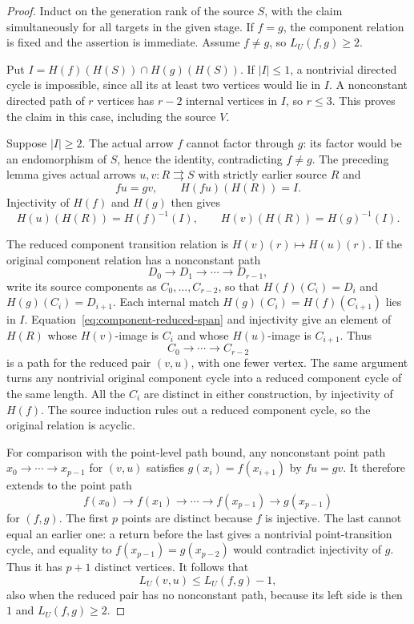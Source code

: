\begin{proof}
Induct on the generation rank of the source $S$, with the claim
simultaneously for all targets in the given stage. If $f=g$,
the component relation is fixed and the assertion is immediate.
Assume $f\ne g$, so $L_U(f,g)\geq2$.

Put $I=H(f)(H(S))\cap H(g)(H(S))$. If $|I|\leq1$, a
nontrivial directed cycle is impossible, since all its at least
two vertices would lie in $I$. A nonconstant directed path of
$r$ vertices has $r-2$ internal vertices in $I$, so $r\leq3$.
This proves the claim in this case, including the source $V$.

Suppose $|I|\geq2$. The actual arrow $f$ cannot factor through
$g$: its factor would be an endomorphism of $S$, hence the
identity, contradicting $f\ne g$. The preceding lemma gives
actual arrows $u,v:R\rightrightarrows S$ with strictly earlier
source $R$ and
\[
                    fu=gv,\qquad H(fu)(H(R))=I.
 \tag{RS}\label{eq:component-reduced-span}
\]
Injectivity of $H(f)$ and $H(g)$ then gives
\[
 H(u)(H(R))=H(f)^{-1}(I),\qquad
 H(v)(H(R))=H(g)^{-1}(I).
\]

The reduced component transition relation is
$H(v)(r)\mapsto H(u)(r)$. If the original component relation
has a nonconstant path
\[
                   D_0\longrightarrow D_1\longrightarrow
                          \cdots\longrightarrow D_{r-1},
\]
write its source components as $C_0,\ldots,C_{r-2}$, so that
$H(f)(C_i)=D_i$ and $H(g)(C_i)=D_{i+1}$. Each internal match
$H(g)(C_i)=H(f)(C_{i+1})$ lies in $I$.
Equation~\eqref{eq:component-reduced-span} and injectivity
give an element of $H(R)$ whose $H(v)$-image is $C_i$ and whose
$H(u)$-image is $C_{i+1}$. Thus
\[
                      C_0\longrightarrow\cdots
                           \longrightarrow C_{r-2}
\]
is a path for the reduced pair $(v,u)$, with one fewer vertex.
The same argument turns any nontrivial original component cycle
into a reduced component cycle of the same length. All the
$C_i$ are distinct in either construction, by injectivity of
$H(f)$. The source induction rules out a reduced component cycle,
so the original relation is acyclic.

For comparison with the point-level path bound, any nonconstant
point path $x_0\to\cdots\to x_{p-1}$ for $(v,u)$ satisfies
$g(x_i)=f(x_{i+1})$ by $fu=gv$. It therefore extends to the
point path
\[
       f(x_0)\longrightarrow f(x_1)\longrightarrow\cdots
       \longrightarrow f(x_{p-1})\longrightarrow g(x_{p-1})
\]
for $(f,g)$. The first $p$ points are distinct because $f$ is
injective. The last cannot equal an earlier one: a return before
the last gives a nontrivial point-transition cycle, and equality
to $f(x_{p-1})=g(x_{p-2})$ would contradict injectivity of $g$.
Thus it has $p+1$ distinct vertices. It follows that
\[
                    L_U(v,u)\leq L_U(f,g)-1,
\]
also when the reduced pair has no nonconstant path, because its
left side is then $1$ and $L_U(f,g)\geq2$.


\end{proof}
